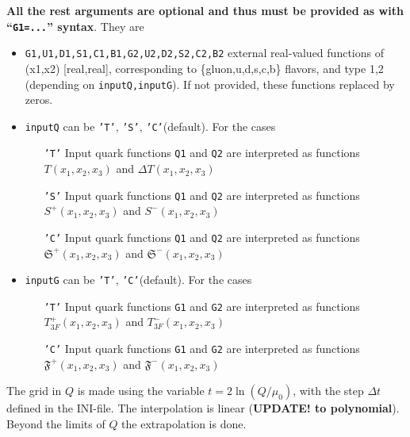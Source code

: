 \documentclass[prd,nofootinbib,eqsecnum,final]{revtex4}
\renewcommand{\(}{\left(}
\renewcommand{\)}{\right)}
\renewcommand{\[}{\left[}
\renewcommand{\]}{\right]}
\newcommand{\red}[1]{{\color[rgb]{1,0,0} #1}}
\begin{document}
\textbf{All the rest arguments are optional and thus must be provided as with ``\texttt{G1=...}'' syntax}. They are
\begin{itemize}
\item \texttt{G1,U1,D1,S1,C1,B1,G2,U2,D2,S2,C2,B2} external real-valued functions of (x1,x2) [real,real], corresponding to \{gluon,u,d,s,c,b\} flavors, and type 1,2 (depending on \texttt{inputQ,inputG}). \red{If not provided, these functions replaced by zeros.}
\item \texttt{inputQ} can be \texttt{'T'}, \texttt{'S'}, \texttt{'C'}(default). For the cases
\begin{itemize}
\item[\texttt{'T'}] Input quark functions \texttt{Q1} and \texttt{Q2} are interpreted as functions $T(x_1,x_2,x_3)$ and $\Delta T(x_1,x_2,x_3)$
\item[\texttt{'S'}] Input quark functions \texttt{Q1} and \texttt{Q2} are interpreted as functions $S^+(x_1,x_2,x_3)$ and $S^-(x_1,x_2,x_3)$
\item[\texttt{'C'}] Input quark functions \texttt{Q1} and \texttt{Q2} are interpreted as functions $\mathfrak{S}^+(x_1,x_2,x_3)$ and $\mathfrak{S}^-(x_1,x_2,x_3)$
\end{itemize}
\item \texttt{inputG} can be \texttt{'T'}, \texttt{'C'}(default). For the cases
\begin{itemize}
\item[\texttt{'T'}] Input quark functions \texttt{G1} and \texttt{G2} are interpreted as functions $T^+_{3F}(x_1,x_2,x_3)$ and $T^-_{3F}(x_1,x_2,x_3)$
\item[\texttt{'C'}] Input quark functions \texttt{G1} and \texttt{G2} are interpreted as functions $\mathfrak{F}^+(x_1,x_2,x_3)$ and $\mathfrak{F}^-(x_1,x_2,x_3)$
\end{itemize}
\end{itemize}
The grid in $Q$ is made using the variable $t=2\ln(Q/\mu_0)$, with the step $\Delta t$ defined in the INI-file. The interpolation is linear (\textbf{UPDATE! to polynomial}). Beyond the limits of $Q$ the extrapolation is done.
\end{document}
